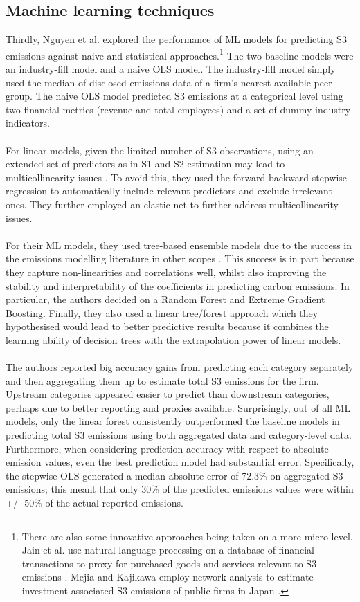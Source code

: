 \documentclass[12pt,twoside]{report}
\begin{document}
\subsection{Machine learning techniques}
Thirdly, Nguyen et al. \cite{Nguyenetal2023} explored the performance of ML models for predicting S3 emissions against naive and statistical approaches.\footnote{There are also some innovative approaches being taken on a more micro level. Jain et al. use natural language processing on a database of financial transactions to proxy for purchased goods and services relevant to S3 emissions \cite{jain2023}. Mejia and Kajikawa employ network analysis to estimate investment-associated S3 emissions of public firms in Japan \cite{Mejia2024}.} The two baseline models were an industry-fill model and a naive OLS model. The industry-fill model simply used the median of disclosed emissions data of a firm's nearest available peer group. The naive OLS model predicted S3 emissions at a categorical level using two financial metrics (revenue and total employees) and a set of dummy industry indicators. 
\\\\
For linear models, given the limited number of S3 observations, using an extended set of predictors as in S1 and S2 estimation may lead to multicollinearity issues \cite{nguyen2021}. To avoid this, they used the forward-backward stepwise regression to automatically include relevant predictors and exclude irrelevant ones. They further employed an elastic net to further address multicollinearity issues. 
\\\\
For their ML models, they used tree-based ensemble models due to the success in the emissions modelling literature in other scopes \cite{nguyen2021, han2021}. This success is in part because they capture non-linearities and correlations well, whilst also improving the stability and interpretability of the coefficients in predicting carbon emissions. In particular, the authors decided on a Random Forest and Extreme Gradient Boosting. Finally, they also used a linear tree/forest approach which they hypothesised would lead to better predictive results because it combines the learning ability of decision trees with the extrapolation power of linear models. 
\\\\
The authors reported big accuracy gains from predicting each category separately and then aggregating them up to estimate total S3 emissions for the firm. Upstream categories appeared easier to predict than downstream categories, perhaps due to better reporting and proxies available. Surprisingly, out of all ML models, only the linear forest consistently outperformed the baseline models in predicting total S3 emissions using both aggregated data and category-level data. Furthermore, when considering prediction accuracy with respect to absolute emission values, even the best prediction model had substantial error. Specifically, the stepwise OLS generated a median absolute error of 72.3\% on aggregated S3 emissions; this meant that only 30\% of the predicted emissions values were within +/- 50\% of the actual reported emissions. 
\end{document}
